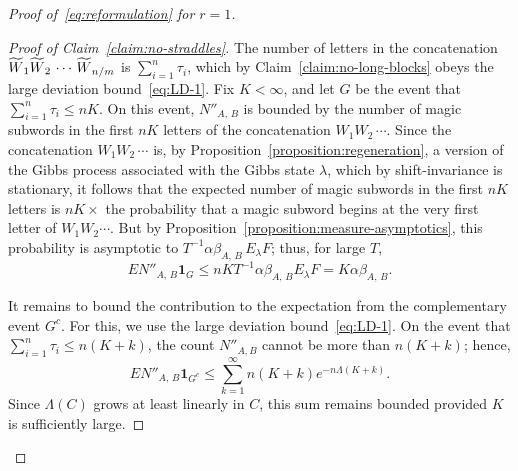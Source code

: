 \documentclass[AHL, Unicode, longabstracts, published]{cedram}
\let\oldtilde\tilde
\renewcommand*{\tilde}[1]{\mathchoice{\widetilde{#1}}{\widetilde{#1}}{\oldtilde{#1}}{\oldtilde{#1}}}\let\oldforall\forall
\renewcommand*{\forall}{\mathrel{\oldforall}}
\begin{document}
\begin{proof}[Proof of~\eqref{eq:reformulation} for $r= 1$]
\begin{proof}[Proof of Claim~\ref{claim:no-straddles}]
The number of letters in the concatenation $\tilde{W}_{1}\tilde{W}_{2}\,\dotsb\,\tilde{W}_{n/m}$ is $\sum_{i=1}^{n}\tau_{i}$, which by Claim~\ref{claim:no-long-blocks} obeys the large deviation bound~\eqref{eq:LD-1}. Fix $K<\infty$, and let $G$ be the event that $\sum_{i=1}^{n}\tau_{i} \leq nK$. On this event, $N''_{A,\,B}$ is bounded by the number of magic subwords in the first $nK$ letters of the concatenation $W_{1}W_{2}\,\dotsb$. Since the concatenation $W_{1}W_{2}\,\dotsb $ is, by Proposition~\ref{proposition:regeneration}, a version of the Gibbs process associated with the Gibbs state $\lambda$, which by shift-invariance is stationary, it follows that the expected number of magic subwords in the first $nK$ letters is $nK \times $ the probability that a magic subword begins at the very first letter of $W_{1}W_{2}\dotsb $. But by Proposition~\ref{proposition:measure-asymptotics}, this probability is asymptotic to $ T^{-1}\alpha \beta_{A,\,B}\,E_{\lambda} F$; thus, for large $T$,
\begin{equation*}
EN''_{A,\,B}\mathbf{1}_{G}\leq nKT^{-1}\alpha
\beta_{A,\,B}E_{\lambda}F =K\alpha \beta_{A,\,B}.
\end{equation*}

It remains to bound the contribution to the expectation from the complementary event $G^{c}$. For this, we use the large deviation bound~\eqref{eq:LD-1}. On the event that $\sum_{i=1}^{n}\tau_{i} \leq n (K+k)$, the count $N''_{A,B}$ cannot be more than $n (K+k)$; hence,
\[
EN''_{A,\,B}\mathbf{1}_{G^{c}}\leq \sum_{k=1}^{\infty} n (K+k) e^{-n\Lambda (K+k)}.
\]
Since $\Lambda (C)$ grows at least linearly in $C$, this sum remains bounded provided $K$ is sufficiently large.
\end{proof}


\end{proof}
\end{document}
